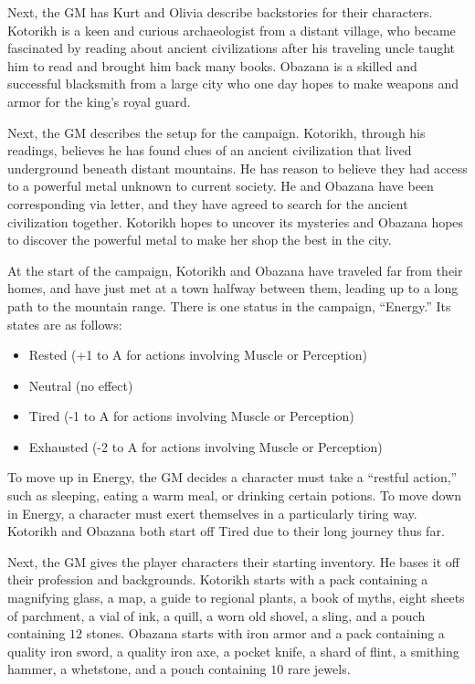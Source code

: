 \begin{example}
Next, the GM has Kurt and Olivia describe backstories for their characters.
Kotorikh is a keen and curious archaeologist from a distant village, who became fascinated by reading about ancient civilizations after his traveling uncle taught him to read and brought him back many books.
Obazana is a skilled and successful blacksmith from a large city who one day hopes to make weapons and armor for the king’s royal guard.

Next, the GM describes the setup for the campaign.
Kotorikh, through his readings, believes he has found clues of an ancient civilization that lived underground beneath distant mountains.
He has reason to believe they had access to a powerful metal unknown to current society.
He and Obazana have been corresponding via letter, and they have agreed to search for the ancient civilization together.
Kotorikh hopes to uncover its mysteries and Obazana hopes to discover the powerful metal to make her shop the best in the city.

At the start of the campaign, Kotorikh and Obazana have traveled far from their homes, and have just met at a town halfway between them, leading up to a long path to the mountain range.
There is one status in the campaign, ``Energy.'' Its states are as follows:
\begin{itemize}
\item Rested (+1 to A for actions involving Muscle or Perception)
\item Neutral (no effect)
\item Tired (-1 to A for actions involving Muscle or Perception)
\item Exhausted (-2 to A for actions involving Muscle or Perception)
\end{itemize}
To move up in Energy, the GM decides a character must take a ``restful action,'' such as sleeping, eating a warm meal, or drinking certain potions.
To move down in Energy, a character must exert themselves in a particularly tiring way.
Kotorikh and Obazana both start off Tired due to their long journey thus far.

Next, the GM gives the player characters their starting inventory.
He bases it off their profession and backgrounds.
Kotorikh starts with a pack containing a magnifying glass, a map, a guide to regional plants, a book of myths, eight sheets of parchment, a vial of ink, a quill,
a worn old shovel, a sling, and a pouch containing $12$ stones.
Obazana starts with iron armor and a pack containing a quality iron sword, a quality iron axe, a pocket knife, a shard of flint, a smithing hammer, a whetstone,
and a pouch containing $10$ rare jewels.


\end{example}
